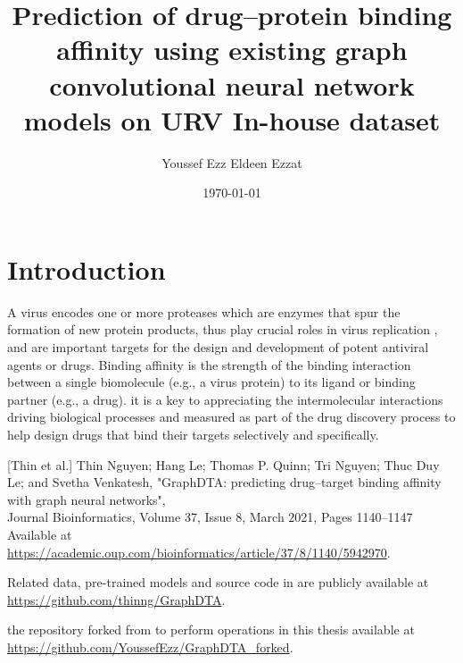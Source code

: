 \documentclass[11pt, a4paper]{article}
\title{Prediction of drug–protein binding affinity using existing graph convolutional neural network models on URV In-house dataset}
\author{Youssef Ezz Eldeen Ezzat}
\date{\today}
\begin{document}


\tableofcontents

\section{Introduction}

A virus encodes one or more proteases which are enzymes that spur the formation of new protein products, thus play crucial roles in virus replication ,
and are important targets for the design and development of potent antiviral agents or drugs.
Binding affinity is the strength of the binding interaction between a single biomolecule (e.g., a virus protein) to its ligand or binding partner (e.g., a drug).
it is a key to appreciating the intermolecular interactions driving biological processes and measured as part of the drug discovery process to help design drugs that bind their targets selectively and specifically.

\begin{thebibliography}{3}

    [Thin et al.] Thin Nguyen;  Hang Le; Thomas P. Quinn; Tri Nguyen; Thuc Duy Le; and
    Svetha Venkatesh, "GraphDTA: predicting drug–target binding affinity with
    graph neural networks",
    \\Journal Bioinformatics, Volume 37, Issue 8, March 2021, Pages 1140–1147
    \\Available at
    \url{https://academic.oup.com/bioinformatics/article/37/8/1140/5942970}.

    Related data, pre-trained models and source code in \cite{1} are publicly available at \url{https://github.com/thinng/GraphDTA}.

    the repository forked from \cite{2} to perform operations in this thesis available at \url{https://github.com/YoussefEzz/GraphDTA_forked}.


\end{thebibliography}
\end{document}
